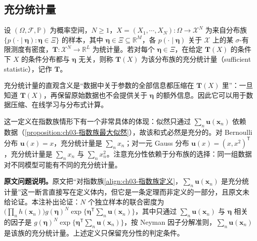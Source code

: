 \documentclass[../../main.tex]{subfiles}
\begin{document}
\subsection{充分统计量}\label{subsection:ch03-充分统计量}

\begin{definition}[充分统计量]\label{definition:ch03-充分统计量}
设 $(\Omega,\mathcal{F},\mathbb{P})$ 为概率空间，$N\geqslant1$，$X=(X_1,\cdots,X_N):\Omega\to\mathcal{X}^{N}$ 为来自分布族 $\{p(\cdot\mid\boldsymbol{\eta}):\boldsymbol{\eta}\in\Xi\}$ 的样本，其中 $\boldsymbol{\eta}\in\Xi\subseteq\mathbb{R}^{M}$，各 $p(\cdot\mid\boldsymbol{\eta})$ 关于 $\mathcal{X}$ 上的某 $\sigma$-有限测度有密度，$\boldsymbol{T}:\mathcal{X}^{N}\to\mathbb{R}^{L}$ 为统计量。若对每个 $\boldsymbol{\eta}\in\Xi$，在给定 $\boldsymbol{T}(X)$ 的条件下 $X$ 的条件分布都与 $\boldsymbol{\eta}$ 无关，则称 $\boldsymbol{T}(X)$ 为该分布族的充分统计量（sufficient statistic），记作 $\boldsymbol{T}$。
\end{definition}

\begin{remark}
充分统计量的直观含义是“数据中关于参数的全部信息都压缩在 $\boldsymbol{T}(X)$ 里”：一旦知道 $\boldsymbol{T}(X)$，再保留原始数据也不会提供关于 $\boldsymbol{\eta}$ 的额外信息。因此它可以用于数据压缩、在线学习与分布式计算。

这一定义在指数族情形下有一个非常具体的体现：似然只通过 $\sum_n\boldsymbol{u}(\boldsymbol{x}_n)$ 依赖数据（\cref{proposition:ch03-指数族最大似然}），故该和式必然是充分的。对 Bernoulli 分布 $\boldsymbol{u}(x)=x$，充分统计量是 $\sum_n x_n$；对一元 Gauss 分布 $\boldsymbol{u}(x)=(x,x^{2})^{\mathsf{T}}$，充分统计量是 $\sum_n x_n$ 与 $\sum_n x_n^{2}$。注意充分性依赖于分布族的选择：同一组数据对不同模型可能有不同的充分统计量。

\textbf{原文问题说明。}原文把“对指数族\eqref{align:ch03-指数族定义}，$\sum_n\boldsymbol{u}(\boldsymbol{x}_n)$ 是充分统计量”这一断言直接写在定义体内，但它是一条定理而非定义的一部分，且原文未给论证。本注补出论证：$N$ 个独立样本的联合密度为 $\bigl(\prod_n h(\boldsymbol{x}_n)\bigr)g(\boldsymbol{\eta})^{N}\exp\bigl\{\boldsymbol{\eta}^{\mathsf{T}}\sum_n\boldsymbol{u}(\boldsymbol{x}_n)\bigr\}$，其中只通过 $\sum_n\boldsymbol{u}(\boldsymbol{x}_n)$ 与 $\boldsymbol{\eta}$ 相关的因子是 $g(\boldsymbol{\eta})^{N}\exp\{\boldsymbol{\eta}^{\mathsf{T}}\sum_n\boldsymbol{u}(\boldsymbol{x}_n)\}$，按 Neyman 因子分解准则，$\sum_n\boldsymbol{u}(\boldsymbol{x}_n)$ 是该族的充分统计量。上述定义只保留充分性的判定条件。
\end{remark}
\end{document}
